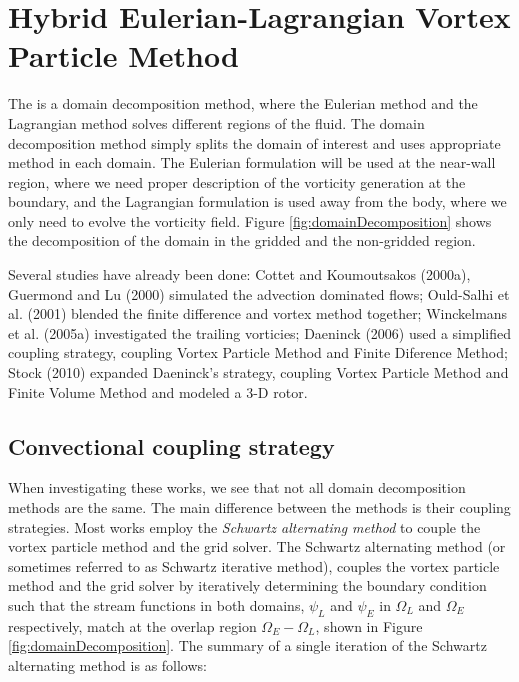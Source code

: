\chapter{Hybrid Eulerian-Lagrangian Vortex Particle Method}


The  is a domain decomposition method, where the Eulerian method and the Lagrangian method solves different regions of the fluid. The domain decomposition method simply splits the domain of interest and uses appropriate method in each domain. The Eulerian formulation will be used at the near-wall region, where we need proper description of the vorticity generation at the boundary, and the Lagrangian formulation is used away from the body, where we only need to evolve the vorticity field. Figure \ref{fig:domainDecomposition} shows the decomposition of the domain in the gridded and the non-gridded region.

Several studies have already been done: Cottet and Koumoutsakos (2000a)\cite{Cottet2000a}, Guermond and Lu (2000) \cite{Guermond2000a} simulated the advection dominated flows; Ould-Salhi et al. (2001) \cite{Ould-Salihi2001a} blended the finite difference and vortex method together; Winckelmans et al. (2005a) \cite{Winckelmans2005} investigated the trailing vorticies; Daeninck (2006) \cite{Daeninck2006} used a simplified coupling strategy, coupling Vortex Particle Method and Finite Diference Method; Stock (2010) \cite{Stock2010a} expanded Daeninck's strategy, coupling Vortex Particle Method and Finite Volume Method and modeled a 3-D rotor.

	\section{Convectional coupling strategy}
	
	When investigating these works, we see that not all domain decomposition methods are the same. The main difference between the methods is their coupling strategies. Most works employ the\textit{ Schwartz alternating method} to couple the vortex particle method and the grid solver. The Schwartz alternating method (or sometimes referred to as Schwartz iterative method), couples the vortex particle method and the grid solver by iteratively determining the boundary condition such that the stream functions in both domains, $\psi_L$ and $\psi_E$ in $\Omega_L$ and $\Omega_E$ respectively, match at the overlap region $\Omega_E-\Omega_L$, shown in Figure \ref{fig:domainDecomposition}. The summary of a single iteration of the Schwartz alternating method is as follows:
	
